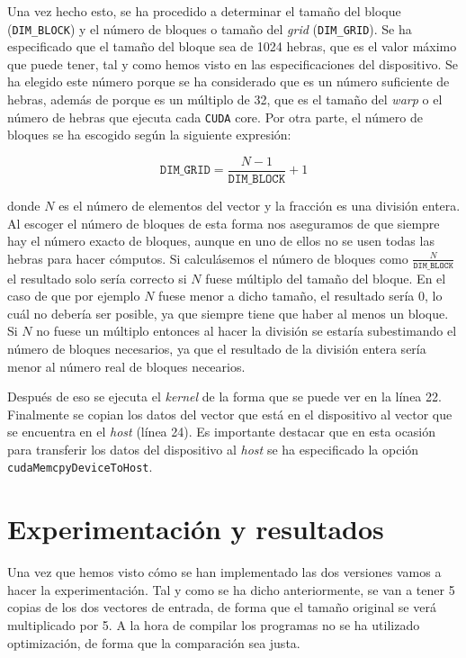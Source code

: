 \documentclass[11pt,a4paper]{article}
\begin{document}
Una vez hecho esto, se ha procedido a determinar el tamaño del bloque (\texttt{DIM\_BLOCK})
y el número de bloques o tamaño del \textit{grid} (\texttt{DIM\_GRID}). Se ha especificado
que el tamaño del bloque sea de 1024 hebras, que es el valor máximo que puede tener, tal y
como hemos visto en las especificaciones del dispositivo. Se ha elegido este número porque
se ha considerado que es un número suficiente de hebras, además de porque es un múltiplo de
32, que es el tamaño del \textit{warp} o el número de hebras que ejecuta cada \texttt{CUDA}
core. Por otra parte, el número de bloques se ha escogido según la siguiente expresión:

\begin{equation}
\texttt{DIM\_GRID} = \frac{N - 1}{\texttt{DIM\_BLOCK}} + 1
\label{eq:dim-grid}
\end{equation}

\noindent donde $N$ es el número de elementos del vector y la fracción es una división
entera. Al escoger el número de bloques de esta forma nos aseguramos de que siempre hay
el número exacto de bloques, aunque en uno de ellos no se usen todas las hebras para hacer
cómputos. Si calculásemos el número de bloques como $\frac{N}{\texttt{DIM\_BLOCK}}$ el resultado
solo sería correcto si $N$ fuese múltiplo del tamaño del bloque. En el caso de que por ejemplo
$N$ fuese menor a dicho tamaño, el resultado sería 0, lo cuál no debería ser posible,
ya que siempre tiene que haber al menos un bloque. Si $N$ no fuese un múltiplo entonces al
hacer la división se estaría subestimando el número de bloques necesarios, ya que el resultado
de la división entera sería menor al número real de bloques necearios.

Después de eso se ejecuta el \textit{kernel} de la forma que se puede ver en la línea 22.
Finalmente se copian los datos del vector que está en el dispositivo al vector que se encuentra
en el \textit{host} (línea 24). Es importante destacar que en esta ocasión para transferir
los datos del dispositivo al \textit{host} se ha especificado la opción
\texttt{cudaMemcpyDeviceToHost}.

\section{Experimentación y resultados}

Una vez que hemos visto cómo se han implementado las dos versiones vamos a hacer la
experimentación. Tal y como se ha dicho anteriormente, se van a tener 5 copias de los dos
vectores de entrada, de forma que el tamaño original se verá multiplicado por 5. A la hora
de compilar los programas no se ha utilizado optimización, de forma que la comparación sea
justa.
\end{document}
